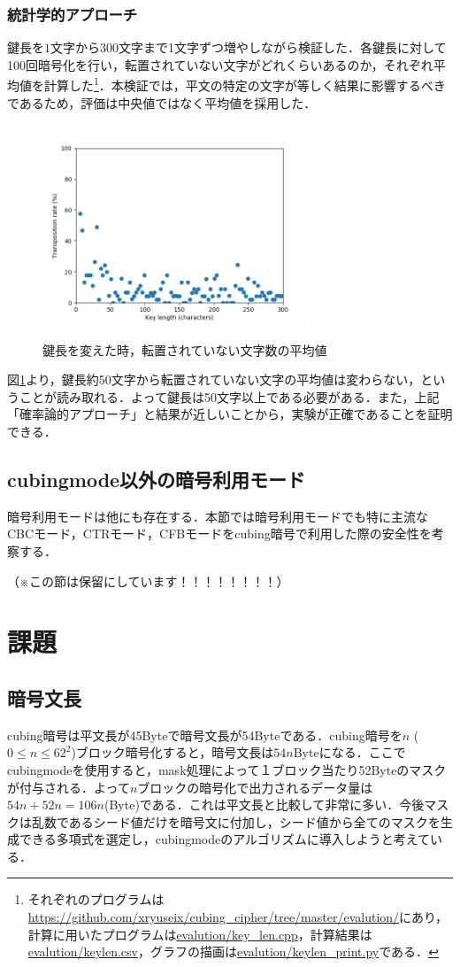 \documentclass[a4j,titlepage]{jsarticle}
\begin{document}
\subsubsection{統計学的アプローチ}
鍵長を\(1\)文字から\(300\)文字まで1文字ずつ増やしながら検証した．各鍵長に対して100回暗号化を行い，転置されていない文字がどれくらいあるのか，それぞれ平均値を計算した\footnote{それぞれのプログラムは\url{https://github.com/xryuseix/cubing_cipher/tree/master/evalution/}にあり，計算に用いたプログラムは\url{evalution/key_len.cpp}，計算結果は\url{evalution/keylen.csv}，グラフの描画は\url{evalution/keylen_print.py}である．}．本検証では，平文の特定の文字が等しく結果に影響するべきであるため，評価は中央値ではなく平均値を採用した．
\begin{figure}
  \centering
  \includegraphics[width=8cm]{./tex_pic/figure.png}\\
  \caption{鍵長を変えた時，転置されていない文字数の平均値}
  \label{fig:key-len}
\end{figure}
図\ref{fig:key-len}より，鍵長約50文字から転置されていない文字の平均値は変わらない，ということが読み取れる．よって鍵長は50文字以上である必要がある．また，上記「確率論的アプローチ」と結果が近しいことから，実験が正確であることを証明できる．

\subsection{cubingmode以外の暗号利用モード}
暗号利用モードは他にも存在する．本節では暗号利用モードでも特に主流なCBCモード，CTRモード，CFBモードをcubing暗号で利用した際の安全性を考察する．

（※この節は保留にしています！！！！！！！！）

\section{課題}
\subsection{暗号文長}
cubing暗号は平文長が45Byteで暗号文長が54Byteである．cubing暗号を\(n\) (\(0 \leq n \leq 62^2\))ブロック暗号化すると，暗号文長は\(54n\)Byteになる．ここでcubingmodeを使用すると，mask処理によって１ブロック当たり52Byteのマスクが付与される．よって\(n\)ブロックの暗号化で出力されるデータ量は\(54n+52n=106n\)(Byte)である．これは平文長と比較して非常に多い．今後マスクは乱数であるシード値だけを暗号文に付加し，シード値から全てのマスクを生成できる多項式を選定し，cubingmodeのアルゴリズムに導入しようと考えている．
\end{document}
